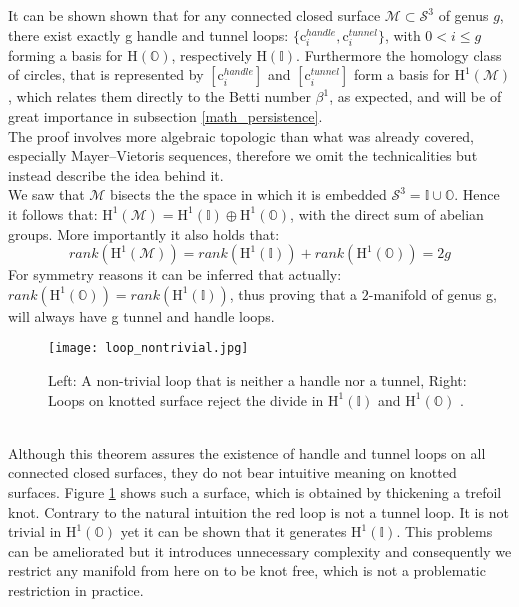 It can be shown shown that for any connected closed surface $\mathcal{M} \subset \mathcal{S}^{3}$ of genus $g$, there exist exactly g handle and tunnel loops: $\{\mathrm{c}^{handle}_{i}, \mathrm{c}^{tunnel}_{i}\}$, with $0 < i \leq g$ forming a basis for $\mathrm{H}(\mathbb{O})$, respectively $\mathrm{H}(\mathbb{I})$.
Furthermore the homology class of circles, that is represented by $[\mathrm{c}^{handle}_{i}]$ and $[\mathrm{c}^{tunnel}_{i}]$ form a basis for $\mathrm{H}^{1}(\mathcal{M})$, which relates them directly to the Betti number $\beta^{1}$, as expected, and will be of great importance in subsection \ref{math_persistence}.\\
The proof involves more algebraic topologic than what was already covered, especially Mayer–Vietoris sequences, therefore we omit the technicalities but instead describe the idea behind it.\\
We saw that $\mathcal{M}$ bisects the the space in which it is embedded $\mathcal{S}^{3} = \mathbb{I} \cup \mathbb{O}$.
Hence it follows that: $\mathrm{H}^{1}(\mathcal{M}) = \mathrm{H}^{1}(\mathbb{I}) \oplus \mathrm{H}^{1}(\mathbb{O})$, with the direct sum of abelian groups.
More importantly it also holds that:
\begin{equation}
rank(\mathrm{H}^{1}(\mathcal{M})) = rank(\mathrm{H}^{1}(\mathbb{I})) + rank(\mathrm{H}^{1}(\mathbb{O})) = 2g
\end{equation}
For symmetry reasons it can be inferred that actually: $rank(\mathrm{H}^{1}(\mathbb{O})) = rank(\mathrm{H}^{1}(\mathbb{I}))$, thus proving that a $2$-manifold of genus g, will always have g tunnel and handle loops.
\begin{figure}[htb]
\centering
\texttt{[image: loop\_nontrivial.jpg]}
\caption{Left: A non-trivial loop that is neither a handle nor a tunnel, Right: Loops on knotted surface reject the divide in $\mathrm{H}^{1}(\mathbb{I})$ and $\mathrm{H}^{1}(\mathbb{O})$ \citep[][]{Dey2012}.}
\label{fig:loop_nontrivial}
\end{figure}\\
Although this theorem assures the existence of handle and tunnel loops on all connected closed surfaces, they do not bear intuitive meaning on knotted surfaces.
Figure \ref{fig:loop_nontrivial} shows such a surface, which is obtained by thickening a trefoil knot.
Contrary to the natural intuition the red loop is not a tunnel loop.
It is not trivial in $\mathrm{H}^{1}(\mathbb{O})$ yet it can be shown that it generates $\mathrm{H}^{1}(\mathbb{I})$.
This problems can be ameliorated but it introduces unnecessary complexity and consequently we restrict any manifold from here on to be knot free, which is not a problematic restriction in practice.\\

